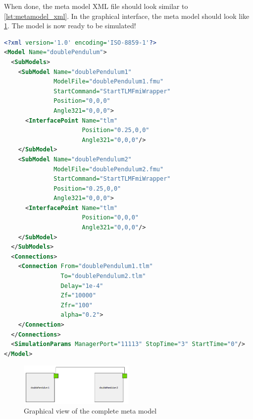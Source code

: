 \documentclass[11pt,a4paper,english]{report}
\begin{document}
When done, the meta model XML file should look similar to \cref{lst:metamodel_xml}.
In the graphical interface, the meta model should look like \cref{fig:metamodel_omedit}.
The model is now ready to be simulated!

\begin{lstlisting}[language=xml,float,floatplacement=ht,label={lst:metamodel_xml},caption=XML description of the complete meta model]
<?xml version='1.0' encoding='ISO-8859-1'?>
<Model Name="doublePendulum">
  <SubModels>
    <SubModel Name="doublePendulum1" 
              ModelFile="doublePendulum1.fmu"
              StartCommand="StartTLMFmiWrapper" 
              Position="0,0,0" 
              Angle321="0,0,0">
      <InterfacePoint Name="tlm" 
                      Position="0.25,0,0" 
                      Angle321="0,0,0"/>
    </SubModel>
    <SubModel Name="doublePendulum2" 
              ModelFile="doublePendulum2.fmu" 
              StartCommand="StartTLMFmiWrapper" 
              Position="0.25,0,0"  
              Angle321="0,0,0">
      <InterfacePoint Name="tlm" 
                      Position="0,0,0" 
                      Angle321="0,0,0"/>
    </SubModel>
  </SubModels>
  <Connections>
    <Connection From="doublePendulum1.tlm" 
                To="doublePendulum2.tlm" 
                Delay="1e-4" 
                Zf="10000"   
                Zfr="100"
                alpha="0.2">
    </Connection>
  </Connections>
  <SimulationParams ManagerPort="11113" StopTime="3" StartTime="0"/>
</Model>
\end{lstlisting}

\begin{figure}
\centering
\includegraphics[width=0.5\textwidth]{gfx/metamodel.png}
\caption{Graphical view of the complete meta model}
\label{fig:metamodel_omedit}
\end{figure}




\end{document}
